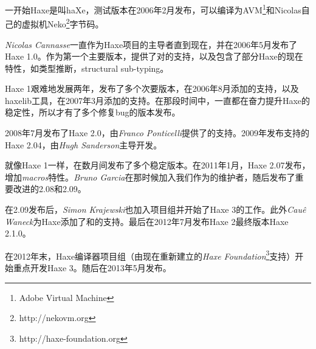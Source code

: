 一开始Haxe是叫haXe，测试版本在2006年2月发布，可以编译为AVM\footnote{Adobe Virtual Machine}和Nicolas自己的虚拟机Neko\footnote{http://nekovm.org}字节码。

\emph{Nicolas Cannasse}一直作为Haxe项目的主导者直到现在，并在2006年5月发布了Haxe 1.0。作为第一个主要版本，提供了对的支持，以及包含了部分Haxe的现在特性，如类型推断，structural sub-typing。

Haxe 1艰难地发展两年，发布了多个次要版本，在2006年8月添加的支持，以及haxelib工具，在2007年3月添加的支持。在那段时间中，一直都在奋力提升Haxe的稳定性，所以才有了多个修复bug的版本发布。

2008年7月发布了Haxe 2.0，由\emph{Franco Ponticelli}提供了的支持。2009年发布支持的Haxe 2.04，由\emph{Hugh Sanderson}主导开发。

就像Haxe 1一样，在数月间发布了多个稳定版本。在2011年1月，Haxe 2.07发布，增加\emph{macros}特性。\emph{Bruno Garcia}在那时候加入我们作为的维护者，随后发布了重要改进的2.08和2.09。

在2.09发布后，\emph{Simon Krajewski}也加入项目组并开始了Haxe 3的工作。此外\emph{Cau\^{e} Waneck}为Haxe添加了和的支持。最后在2012年7月发布Haxe 2最终版本Haxe 2.1.0。

在2012年末，Haxe编译器项目组（由现在重新建立的\emph{Haxe Foundation}\footnote{http://haxe-foundation.org}支持）开始重点开发Haxe 3。随后在2013年5月发布。
